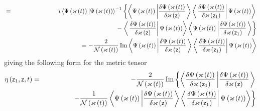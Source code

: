 \begin{eqnarray}
\\
&=&i\left\langle \Psi \left( {\cal \varkappa }\left( t\right) \right) |\Psi
\left( {\cal \varkappa }\left( t\right) \right) \right\rangle ^{-1}\left\{
\left\langle \Psi \left( {\cal \varkappa }\left( t\right) \right) \left| 
\frac{\delta \Psi \left( {\cal \varkappa }\left( t\right) \right) }{\delta 
{\cal \varkappa }\left( {\sf z}\right) }\right. \right\rangle \left\langle
\left. \frac{\delta \Psi \left( {\cal \varkappa }\left( t\right) \right) }{%
\delta {\cal \varkappa }\left( {\sf z}_{1}\right) }\right| \Psi \left( {\cal %
\varkappa }\left( t\right) \right) \right\rangle \right.  \nonumber \\
&&\qquad \qquad \qquad \qquad \qquad \qquad \qquad -\left. \left\langle
\left. \frac{\delta \Psi \left( {\cal \varkappa }\left( t\right) \right) }{%
\delta {\cal \varkappa }\left( {\sf z}\right) }\right| \Psi \left( {\cal %
\varkappa }\left( t\right) \right) \right\rangle \left\langle \Psi \left( 
{\cal \varkappa }\left( t\right) \right) \left| \frac{\delta \Psi \left( 
{\cal \varkappa }\left( t\right) \right) }{\delta {\cal \varkappa }\left( 
{\sf z}_{1}\right) }\right. \right\rangle \right\}  \nonumber \\
&&\left. {}\right. \qquad \qquad \qquad \qquad \qquad =-\frac{2}{{\cal N}%
\left( {\cal \varkappa }\left( t\right) \right) }%
\mathop{\rm Im}%
\left\langle \Psi \left( {\cal \varkappa }\left( t\right) \right) \left| 
\frac{\delta \Psi \left( {\cal \varkappa }\left( t\right) \right) }{\delta 
{\cal \varkappa }\left( {\sf z}\right) }\right. \right\rangle \left\langle
\left. \frac{\delta \Psi \left( {\cal \varkappa }\left( t\right) \right) }{%
\delta {\cal \varkappa }\left( {\sf z}_{1}\right) }\right| \Psi \left( {\cal %
\varkappa }\left( t\right) \right) \right\rangle
\end{eqnarray}%
giving the following form for the metric tensor 
\begin{eqnarray}
\eta \left( {\sf z}_{1},{\sf z},t\right) &=&-\frac{2}{{\cal N}\left( {\cal %
\varkappa }\left( t\right) \right) }%
\mathop{\rm Im}%
\left\{ \left\langle \frac{\delta \Psi \left( {\cal \varkappa }\left(
t\right) \right) }{\delta {\cal \varkappa }\left( {\sf z}_{1}\right) }\left| 
\frac{\delta \Psi \left( {\cal \varkappa }\left( t\right) \right) }{\delta 
{\cal \varkappa }\left( {\sf z}\right) }\right. \right\rangle \right. 
\nonumber \\
&&\qquad \qquad \left. -\frac{1}{{\cal N}\left( {\cal \varkappa }\left(
t\right) \right) }\left\langle \Psi \left( {\cal \varkappa }\left( t\right)
\right) \left| \frac{\delta \Psi \left( {\cal \varkappa }\left( t\right)
\right) }{\delta {\cal \varkappa }\left( {\sf z}\right) }\right.
\right\rangle \left\langle \left. \frac{\delta \Psi \left( {\cal \varkappa }%
\left( t\right) \right) }{\delta {\cal \varkappa }\left( {\sf z}_{1}\right) }%
\right| \Psi \left( {\cal \varkappa }\left( t\right) \right) \right\rangle
\right\}  \label{metric}
\end{eqnarray}%
